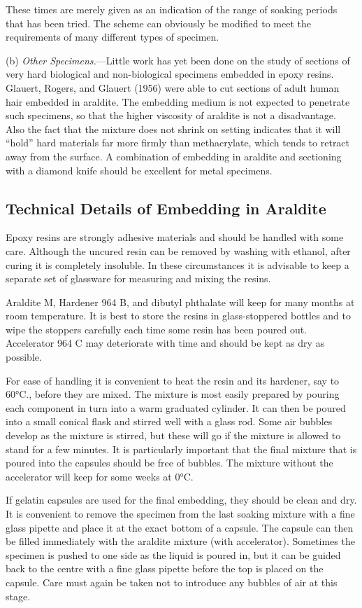 \documentclass{article}
\begin{document}
These times are merely given as an indication of the range of soaking periods that has been tried. The scheme can obviously be modified to meet the requirements of many different types of specimen.

(b) \textit{Other Specimens.}—Little work has yet been done on the study of sections of very hard biological and non-biological specimens embedded in epoxy resins. Glauert, Rogers, and Glauert (1956) were able to cut sections of adult human hair embedded in araldite. The embedding medium is not expected to penetrate such specimens, so that the higher viscosity of araldite is not a disadvantage. Also the fact that the mixture does not shrink on setting indicates that it will ``hold'' hard materials far more firmly than methacrylate, which tends to retract away from the surface. A combination of embedding in araldite and sectioning with a diamond knife should be excellent for metal specimens.

\subsection*{Technical Details of Embedding in Araldite}

Epoxy resins are strongly adhesive materials and should be handled with some care. Although the uncured resin can be removed by washing with ethanol, after curing it is completely insoluble. In these circumstances it is advisable to keep a separate set of glassware for measuring and mixing the resins.

Araldite M, Hardener 964 B, and dibutyl phthalate will keep for many months at room temperature. It is best to store the resins in glass-stoppered bottles and to wipe the stoppers carefully each time some resin has been poured out. Accelerator 964 C may deteriorate with time and should be kept as dry as possible.

For ease of handling it is convenient to heat the resin and its hardener, say to 60°C., before they are mixed. The mixture is most easily prepared by pouring each component in turn into a warm graduated cylinder. It can then be poured into a small conical flask and stirred well with a glass rod. Some air bubbles develop as the mixture is stirred, but these will go if the mixture is allowed to stand for a few minutes. It is particularly important that the final mixture that is poured into the capsules should be free of bubbles. The mixture without the accelerator will keep for some weeks at 0°C.

If gelatin capsules are used for the final embedding, they should be clean and dry. It is convenient to remove the specimen from the last soaking mixture with a fine glass pipette and place it at the exact bottom of a capsule. The capsule can then be filled immediately with the araldite mixture (with accelerator). Sometimes the specimen is pushed to one side as the liquid is poured in, but it can be guided back to the centre with a fine glass pipette before the top is placed on the capsule. Care must again be taken not to introduce any bubbles of air at this stage.
\end{document}
